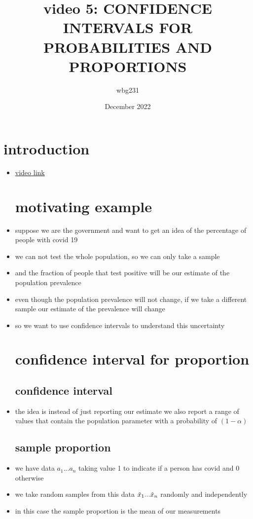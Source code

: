 \documentclass{article}
\title{video 5: CONFIDENCE INTERVALS FOR PROBABILITIES AND PROPORTIONS}
\author{wbg231 }
\date{December 2022}
\begin{document}
\maketitle

\section*{introduction}
\begin{itemize}
\item \href{https://www.youtube.com/watch?v=dlGl2dGNZSI}{video link}
\section{motivating example}
\item suppose we are the government and want to get an idea of the percentage of people with covid 19 
\item we can not test the whole population, so we can only take a sample 
\item and the fraction of people that test positive will be our estimate of the population prevalence 
\item even though the population prevalence will not change, if we take a different sample our estimate of the prevalence will change 
\item so we want to use confidence intervals to understand this uncertainty
\section{confidence interval for proportion}
\subsection{confidence interval}
\item the idea is instead of just reporting our estimate we also report a range of values that contain the population parameter with a probability of $(1-\alpha)$
\subsection{sample proportion }
\item we have data $a_1...a_n$ taking value 1 to indicate if a person has covid and 0 otherwise
\item we take random samples from  this data $\Tilde{x}_1...\Tilde{x}_n$ randomly and independently
\item in this case the sample proportion is the mean of our measurements 

\end{itemize}
\end{document}
